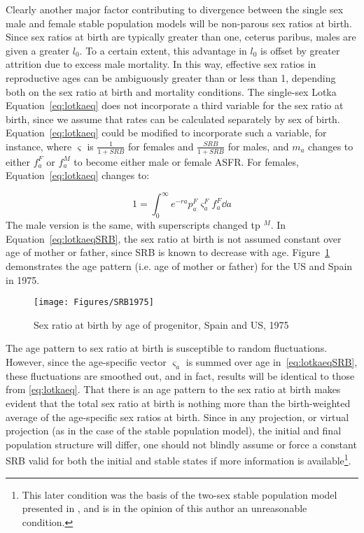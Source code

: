  \FloatBarrier
Clearly another major factor contributing to divergence between the single sex
male and female stable population models will be non-parous sex ratios at birth.
Since sex ratios at birth are typically greater than one, ceterus paribus, males
are given a greater $l_0$. To a certain extent, this advantage in $l_0$ is
offset by greater attrition due to excess male mortality. In this way, effective
sex ratios in reproductive ages can be ambiguously greater than or less than 1,
depending both on the sex ratio at birth and mortality conditions. The
single-sex Lotka Equation~\eqref{eq:lotkaeq} does not incorporate a third
variable for the sex ratio at birth, since we assume that rates can be
calculated separately by sex of birth. Equation~\eqref{eq:lotkaeq} could be
modified to incorporate such a variable, for instance, where $\varsigma$ is
$\tfrac{1}{1+SRB}$ for females and $\tfrac{SRB}{1+SRB}$ for males, and $m_a$
changes to either $f_a^F$ or $f_a^M$ to become either male or female ASFR. For
females, Equation~\ref{eq:lotkaeq} changes to:

\begin{equation}
\label{eq:lotkaeqSRB}
1 = \int _0 ^\infty e^{-ra}p_a^F \varsigma_a^F f_a^F \dd a 
\end{equation}
The male version is the same, with superscripts changed tp $^M$. In
Equation~\eqref{eq:lotkaeqSRB}, the sex ratio at birth is not assumed constant 
over age of mother or father, since SRB is known to decrease with age.
Figure~\ref{fig:SRB1975} demonstrates the age pattern (i.e. age of mother or
father) for the US and Spain in 1975.

\begin{figure}[ht!]
        \centering  
          \caption{Sex ratio at birth by age of progenitor, Spain
          and US, 1975}
           \texttt{[image: Figures/SRB1975]}
          \label{fig:SRB1975}
\end{figure}

The age pattern to sex ratio at birth is susceptible to random
fluctuations. However, since the age-specific vector $\varsigma _a$ is summed
over age in~\eqref{eq:lotkaeqSRB}, these fluctuations are smoothed out, and in
fact, results will be identical to those from \eqref{eq:lotkaeq}. That there is
an age pattern to the sex ratio at birth makes evident that the total sex ratio 
at birth is nothing more than the birth-weighted
average of the age-specific sex ratios at birth. Since in any projection, or virtual projection
(as in the case of the stable population model), the initial and final population structure will differ, one should not blindly assume or force a constant SRB valid for both the initial and stable states
if more information is available\footnote{This later condition was the basis of
the two-sex stable population model presented in \citet{mitra1982alternative,mitra1978derivation,mitra1976effect}, and is in the
opinion of this author an unreasonable condition.}.

